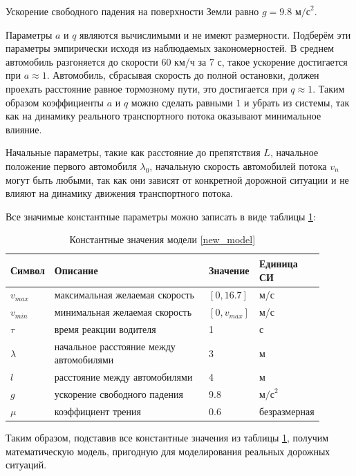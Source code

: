\documentclass[12pt, a4paper]{extarticle}
\numberwithin{equation}{section}
\numberwithin{figure}{section}
\begin{document}
Ускорение свободного падения на поверхности Земли равно $g=9.8 \text{ м/с}^2$.

Параметры $a$ и $q$ являются вычислимыми и не имеют размерности. Подберём эти параметры эмпирически исходя из наблюдаемых закономерностей. В среднем автомобиль разгоняется до скорости 60 км/ч за 7 с, такое ускорение достигается при $a\approx1$. Автомобиль, сбрасывая скорость до полной остановки, должен проехать расстояние равное тормозному пути, это достигается при $q\approx1$. Таким образом коэффициенты $a$ и $q$ можно сделать равными $1$ и убрать из системы, так как на динамику реального транспортного потока оказывают минимальное влияние.

Начальные параметры, такие как расстояние до препятствия $L$, начальное положение первого автомобиля $\lambda_0$, начальную скорость автомобилей потока $v_n$ могут быть любыми, так как они зависят от конкретной дорожной ситуации и не влияют на динамику движения транспортного потока.

Все значимые константные параметры можно записать в виде таблицы \ref{real_parameters}:
\begin{table}[h!]
	\caption{Константные значения модели \eqref{new_model} }
	\label{real_parameters}
	\begin{center}
		\begin{tabularx}{\textwidth}{p{0.12\linewidth}p{0.52\linewidth}p{0.11\linewidth}p{0.15\linewidth}}			
			\hline
			\rule{0cm}{0,5cm}
			Символ & Описание & Значение & Единица СИ \\
			[3pt]\hline
			$v_{max}$ & максимальная желаемая скорость& $[0,16.7]$&м/с\\
			$v_{min}$ & минимальная желаемая скорость& $[0,v_{max}]$&м/с\\ 
			$\tau$ & время реакции водителя& 1&с\\
			$\lambda$ & начальное расстояние между автомобилями& 3&м\\
			$l$ & расстояние между автомобилями& 4&м\\
			$g$ & ускорение свободного падения& 9.8&$\text{м/с}^2$\\ 
			$\mu$ &  коэффициент трения& 0.6& безразмерная\\ 
			\hline
		\end{tabularx}
	\end{center}
\end{table}

Таким образом, подставив все константные значения из таблицы \ref{real_parameters}, получим математическую модель, пригодную для моделирования реальных дорожных ситуаций.
\end{document}
